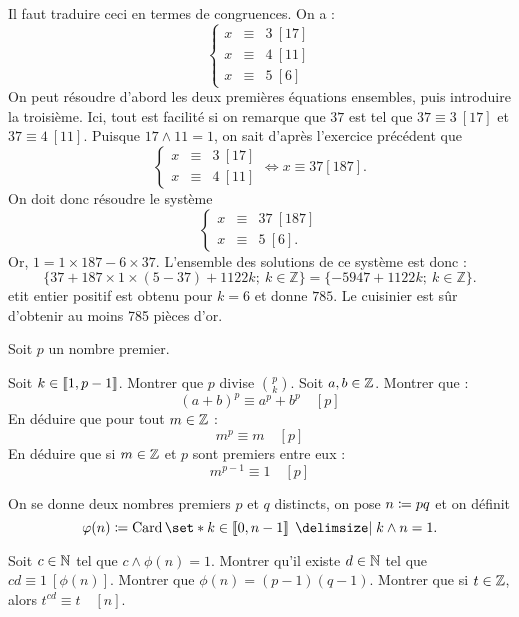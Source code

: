 \documentclass{magnolia}
\begin{document}
\begin{sol}
Il faut traduire ceci en termes de congruences. On a :
$$\left\{
\begin{array}{rcl}
x&\equiv&3\ [17]\\
x&\equiv&4\ [11]\\
x&\equiv&5\ [6]
\end{array}\right.$$
On peut résoudre d'abord les deux premières équations
ensembles, puis introduire la troisième. Ici, tout est facilité si on remarque que $37$ est tel que
$37\equiv 3\ [17]$ et $37\equiv 4\ [11]$. Puisque $17\wedge 11=1$, on sait d'après l'exercice précédent que
$$\left\{
\begin{array}{rcl}
x&\equiv&3\ [17]\\
x&\equiv&4\ [11]
\end{array}\right.
\iff x\equiv 37[187].$$
On doit donc résoudre le système
$$\left\{\begin{array}{rcl}x&\equiv&37\ [187]\\x&\equiv&5\ [6].\end{array}\right.$$
Or, $1=1\times 187-6\times 37$. L'ensemble des solutions de ce système est donc : $$\{37+187\times1\times (5-37)+1122k;\ k\in\mathbb Z\}=\{-5947+1122k;\ k\in\mathbb Z\}.$$
etit entier positif est obtenu pour $k=6$ et donne $785$. Le cuisinier est sûr d'obtenir au moins 785 pièces
d'or.

\end{sol}

\begin{questions}
\question 
Soit $p$ un nombre premier.
  \begin{questions}
  \question  Soit $k\in\left\llbracket 1,p-1\right\rrbracket$. Montrer que $p$ divise $\binom{p}{k}$.
  \question  Soit $a,b \in \mathbb{Z}$. Montrer que :
    \[(a+b)^p\equiv a^p+b^p \quad [p]\]
  \question  En déduire que pour tout $m\in\mathbb{Z}$ :
    \[m^p \equiv m \quad [p]\]
  \question  En déduire que si $m\in\mathbb{Z}$ et $p$ sont premiers entre eux :
    \[m^{p-1} \equiv 1 \quad [p]\]
  \end{questions}
\question  On se donne deux nombres premiers $p$ et $q$ distincts, on pose
  $n\coloneqq pq$ et on définit
  \[\phi(n)\defeq\card\enstq{k\in\intere{0}{n-1}}{k\wedge n=1}.\]
  \begin{questions}
  \question Soit $c\in\mathbb{N}$ tel que $c\wedge \phi(n)=1$. Montrer qu'il existe $d\in\mathbb{N}$ tel que $cd\equiv 1\ [\phi(n)]$.
  \question Montrer que $\phi(n)=(p-1)(q-1)$.
  \question Montrer que si $t\in\mathbb{Z}$, alors $t^{cd}\equiv t \quad [n]$.
  \end{questions}
\end{questions}
\end{document}

